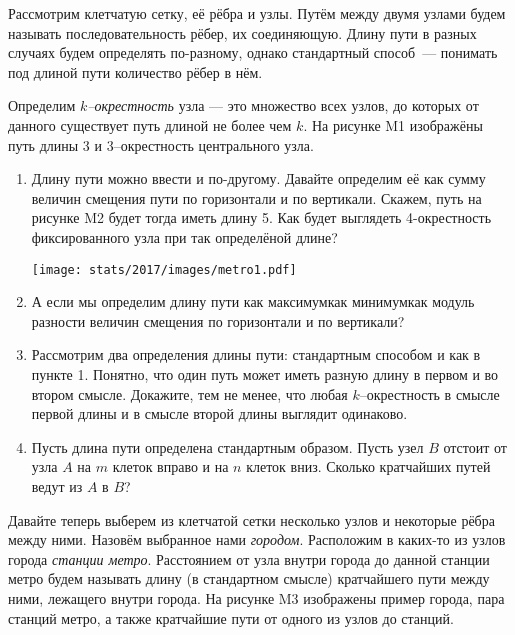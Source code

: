 ﻿

\noindent Рассмотрим клетчатую сетку, её рёбра и узлы. Путём между двумя узлами будем называть последовательность рёбер, их соединяющую. Длину пути в разных случаях будем определять по-разному, однако стандартный способ~— понимать под длиной пути количество рёбер в нём.

\ms Определим {\it $k$--окрестность} узла — это множество всех узлов, до которых от данного существует путь длиной не более чем $k$. На рисунке M1 изображёны путь длины 3 и 3--окрестность центрального узла.

\begin{enumerate}

\item Длину пути можно ввести и по-другому. Давайте определим её как сумму величин смещения пути по горизонтали и по вертикали. Скажем, путь на рисунке M2 будет тогда иметь длину 5. Как будет выглядеть 4-окрестность фиксированного узла при так определёной длине?

\vspace{-0.3cm}
\begin{center}
\texttt{[image: stats/2017/images/metro1.pdf]}
\end{center} \vspace{-0.7cm}

\item А если мы определим длину пути как максимум\scolon как минимум\scolon как модуль разности величин смещения по горизонтали и по вертикали?

\item Рассмотрим два определения длины пути: стандартным способом и как в пункте 1. Понятно, что один путь может иметь разную длину в первом и во втором смысле. Докажите, тем не менее, что любая $k$--окрестность в смысле первой длины и в смысле второй длины выглядит одинаково.

\item Пусть длина пути определена стандартным образом. Пусть узел $B$ отстоит от узла $A$ на $m$ клеток вправо и на $n$ клеток вниз. Сколько кратчайших путей ведут из $A$ в $B$?

\end{enumerate}

\noindent Давайте теперь выберем из клетчатой сетки несколько узлов и некоторые рёбра между ними. Назовём выбранное нами {\it городом}. Расположим в каких-то из узлов города {\it станции метро}. Расстоянием от узла внутри города до данной станции метро будем называть длину (в стандартном смысле) кратчайшего пути между ними, лежащего внутри города. На рисунке M3 изображены пример города, пара станций метро, а также кратчайшие пути от одного из узлов до станций.

